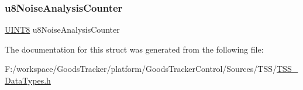 \mbox{\label{struct_t_s_s___delta_noise_analysis_buffer_data_a25b826c93de5cfbe05bd4efa3724e7d1}} 
\subsubsection{\texorpdfstring{u8\+Noise\+Analysis\+Counter}{u8NoiseAnalysisCounter}}
{\footnotesize\ttfamily \hyperlink{_t_s_s___data_types_8h_ab27e9918b538ce9d8ca692479b375b6a}{U\+I\+N\+T8} u8\+Noise\+Analysis\+Counter}



The documentation for this struct was generated from the following file\+:\begin{DoxyCompactItemize}
\item 
F\+:/workspace/\+Goods\+Tracker/platform/\+Goods\+Tracker\+Control/\+Sources/\+T\+S\+S/\hyperlink{_t_s_s___data_types_8h}{T\+S\+S\+\_\+\+Data\+Types.\+h}\end{DoxyCompactItemize}

